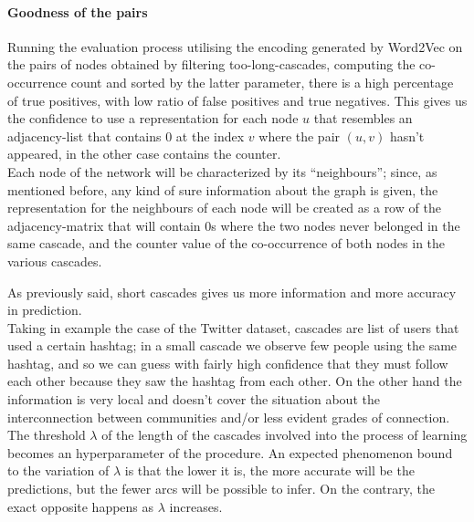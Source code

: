 \documentclass{article}
\begin{document}
			\paragraph{Goodness of the pairs}
			Running the evaluation process utilising the encoding generated by Word2Vec on the pairs of nodes obtained by filtering too-long-cascades, computing the co-occurrence count and sorted by the latter parameter, there is a high percentage of true positives, with low ratio of false positives and true negatives. This gives us the confidence to use a representation for each node $u$ that resembles an adjacency-list that contains 0 at the index $v$ where the pair $(u,v)$ hasn't appeared, in the other case contains the counter.\medskip\\
			
			Each node of the network will be characterized by its \textquotedblleft neighbours\textquotedblright; since, as mentioned before, any kind of sure information about the graph is given, the representation for the neighbours of each node will be created as a row of the adjacency-matrix that will contain 0s where the two nodes never belonged in the same cascade, and the counter value of the co-occurrence of both nodes in the various cascades.
			
			As previously said, short cascades gives us more information and more accuracy in prediction.\\
			Taking in example the case of the Twitter dataset, cascades are list of users that used a certain hashtag; in a small cascade we observe few people using the same hashtag, and so we can guess with fairly high confidence that they must follow each other because they saw the hashtag from each other. On the other hand the information is very local and doesn't cover the situation about the interconnection between communities and/or less evident grades of connection.\medskip\\
			The threshold $\lambda$ of the length of the cascades involved into the process of learning becomes an hyperparameter of the procedure. An expected phenomenon bound to the variation of $\lambda$ is that the lower it is, the more accurate will be the predictions, but the fewer arcs will be possible to infer. On the contrary, the exact opposite happens as $\lambda$ increases.
			
\end{document}
